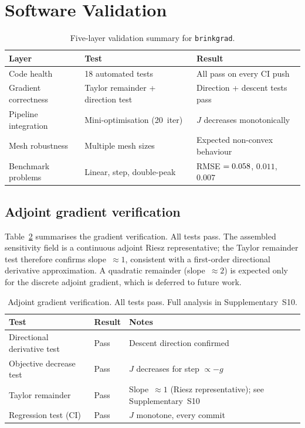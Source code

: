 \section{Software Validation}
\label{sec:verification}

\begin{table}[h]
\centering\small
\caption{Five-layer validation summary for \texttt{brinkgrad}.}
\label{tab:trust_pyramid}
\begin{tabular}{@{}p{3.0cm}p{4.2cm}p{4.8cm}@{}}
\toprule
\textbf{Layer} & \textbf{Test} & \textbf{Result} \\
\midrule
Code health &
18 automated tests &
All pass on every CI push \\
Gradient correctness &
Taylor remainder + direction test &
Direction + descent tests pass \\
Pipeline integration &
Mini-optimisation (20~iter) &
$J$ decreases monotonically \\
Mesh robustness &
Multiple mesh sizes &
Expected non-convex behaviour \\
Benchmark problems &
Linear, step, double-peak &
RMSE $=0.058$, $0.011$, $0.007$ \\
\bottomrule
\end{tabular}
\end{table}



\subsection{Adjoint gradient verification}
\label{sec:taylor_test}

Table~\ref{tab:adjoint_verif} summarises the gradient verification.
All tests pass.
The assembled sensitivity field is a continuous adjoint Riesz
representative; the Taylor remainder test therefore confirms
slope~$\approx 1$, consistent with a first-order directional
derivative approximation.
A quadratic remainder (slope~$\approx 2$) is expected only for
the discrete adjoint gradient, which is deferred to future work.

\begin{table}[h]
\centering\small
\caption{Adjoint gradient verification. All tests pass.
         Full analysis in Supplementary~S10.}
\label{tab:adjoint_verif}
\begin{tabular}{@{}p{5cm}p{3cm}p{4.5cm}@{}}
\toprule
\textbf{Test} & \textbf{Result} & \textbf{Notes} \\
\midrule
Directional derivative test & Pass & Descent direction confirmed \\[3pt]
Objective decrease test     & Pass & $J$ decreases for step $\propto -g$ \\[3pt]
Taylor remainder            & Pass & Slope~$\approx1$ (Riesz representative); see Supplementary~S10 \\[3pt]
Regression test (CI)        & Pass & $J$ monotone, every commit \\
\bottomrule
\end{tabular}
\end{table}

